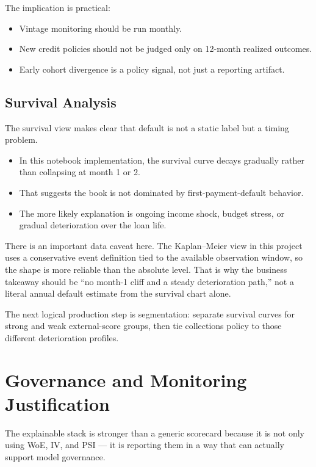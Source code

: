 \documentclass[11pt]{article}
\begin{document}
The implication is practical:

\begin{itemize}
  \item Vintage monitoring should be run monthly.
  \item New credit policies should not be judged only on 12-month realized outcomes.
  \item Early cohort divergence is a policy signal, not just a reporting artifact.
\end{itemize}

\subsection{Survival Analysis}

The survival view makes clear that default is not a static label but a timing problem.

\begin{itemize}
  \item In this notebook implementation, the survival curve decays gradually rather than collapsing at month 1 or 2.
  \item That suggests the book is not dominated by first-payment-default behavior.
  \item The more likely explanation is ongoing income shock, budget stress, or gradual deterioration over the loan life.
\end{itemize}

There is an important data caveat here. The Kaplan--Meier view in this project uses a conservative event definition tied to the available observation window, so the shape is more reliable than the absolute level. That is why the business takeaway should be ``no month-1 cliff and a steady deterioration path,'' not a literal annual default estimate from the survival chart alone.

The next logical production step is segmentation: separate survival curves for strong and weak external-score groups, then tie collections policy to those different deterioration profiles.

\section{Governance and Monitoring Justification}

The explainable stack is stronger than a generic scorecard because it is not only using WoE, IV, and PSI --- it is reporting them in a way that can actually support model governance.
\end{document}
